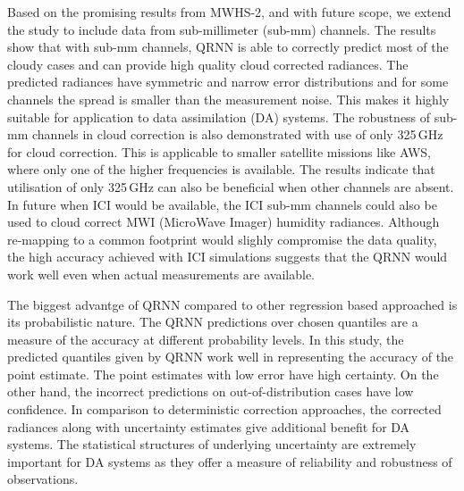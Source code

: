 \documentclass[amt, manuscript]{copernicus}
\begin{document}
Based on the promising results from MWHS-2, and with future scope, we extend the study to include data from sub-millimeter (sub-mm) channels. The results show that with  sub-mm channels, QRNN is able to correctly predict most of the cloudy cases and can provide high quality cloud corrected radiances. The predicted radiances have symmetric and narrow error distributions and for some channels the spread is smaller than the measurement noise. This makes it highly suitable for application to data assimilation (DA) systems. The robustness of sub-mm channels in cloud correction is also demonstrated with use of only 325\,GHz for cloud correction. This is applicable to smaller satellite missions like AWS, where only one of the higher frequencies is available. The results indicate that utilisation of only 325\,GHz can also be beneficial when other channels are absent. In future when ICI would be available, the ICI sub-mm channels could also be used to cloud correct MWI (MicroWave Imager) humidity radiances. Although re-mapping to a common footprint would slighly compromise the data quality, the high accuracy achieved with ICI simulations suggests that the QRNN would work well even when actual measurements are available.

The biggest advantge of QRNN compared to other regression based approached is its probabilistic nature. The QRNN predictions over chosen quantiles are a measure of the accuracy at different probability levels. In this study, the predicted quantiles given by QRNN work well in representing the accuracy of the point estimate. The point estimates with low error have high certainty. On the other hand, the  incorrect predictions on out-of-distribution cases have low confidence. In comparison to deterministic correction approaches, the corrected radiances along with uncertainty estimates give additional benefit for DA systems. The statistical structures of underlying uncertainty are extremely important for DA systems as they offer a measure of reliability and robustness of observations.
\end{document}
